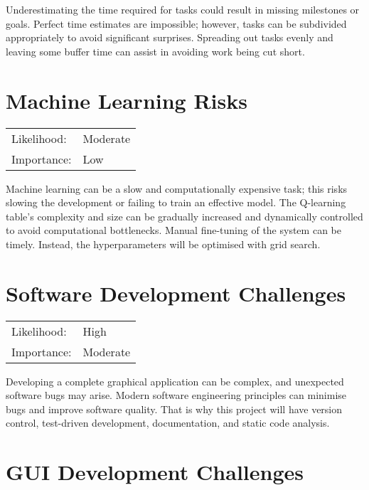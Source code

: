 \documentclass[]{final_report}
\begin{document}
Underestimating the time required for tasks could result in missing milestones or goals. Perfect time estimates are impossible; however, tasks can be subdivided appropriately to avoid significant surprises. Spreading out tasks evenly and leaving some buffer time can assist in avoiding work being cut short. 

\section{Machine Learning Risks}

\begin{center}
    \begin{tabular}{l l  }
    Likelihood: & Moderate \\
    Importance: & Low \\
    \end{tabular}
  \end{center}

Machine learning can be a slow and computationally expensive task; this risks slowing the development or failing to train an effective model. The Q-learning table's complexity and size can be gradually increased and dynamically controlled to avoid computational bottlenecks. Manual fine-tuning of the system can be timely. Instead, the hyperparameters will be optimised with grid search. 

\newpage
\section{Software Development Challenges}

\begin{center}
    \begin{tabular}{l l  }
    Likelihood: & High \\
    Importance: & Moderate \\
    \end{tabular}
  \end{center}

Developing a complete graphical application can be complex, and unexpected software bugs may arise. Modern software engineering principles can minimise bugs and improve software quality. That is why this project will have version control, test-driven development, documentation, and static code analysis. 

\section{GUI Development Challenges}
\end{document}
